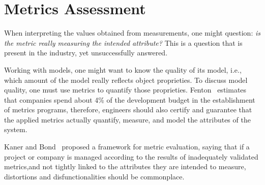\section{Metrics Assessment} \label{assess}
\begin{comment}
Effective management of any process requires quantification, measurement, and modeling.
Software metrics provide a quantitative basis for the development and validation of models of the software development process.
Metrics can be used to improve software productivity and quality\cite{g1:Millis:1998}.
\end{comment}



When interpreting the values obtained from measurements, one might question: \emph{is the metric really measuring the intended attribute?} This is a question that is present in the industry, yet unsuccessfully answered. 

Working with models, one might want to know the quality of its model, i.e., which amount of the model really reflects object proprieties. To discuss model quality, one must use metrics to quantify those proprieties. Fenton~\cite{g1:Fenton:1999} estimates that companies spend about 4\% of the development budget in the establishment of metrics programs, therefore, engineers should also certify and guarantee that the applied metrics actually quantify, measure, and model the attributes of the system.

Kaner and Bond~\cite{g1:kaner:2004} proposed a framework for metric evaluation, saying that if a project or company is managed according to the results of inadequately validated metrics,and  not tightly linked to the attributes they are intended to measure, distortions and disfunctionalities should be commonplace.

\begin{comment}
	This has a likely consequence: if a project or company is managed according to the results of measurements, and those metrics are inadequately validated, insufficiently understood, and not tightly linked to the attributes they are intended to measure, measurement distortions and dysfunctional should be commonplace\cite{g1:kaner:2004}.
\end{comment}

